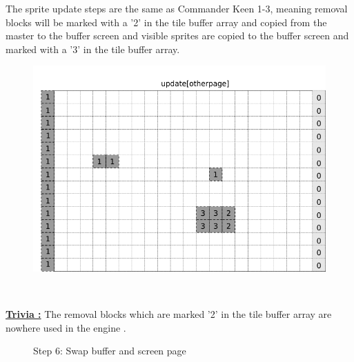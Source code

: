 \documentclass[book.tex]{subfiles}
\begin{document}
\begin{minipage}{.4\textwidth}
The sprite update steps are the same as Commander Keen 1-3, meaning removal blocks will be marked with a '2' in the tile buffer array and copied from the master to the buffer screen and visible sprites are copied to the buffer screen and marked with a '3' in the tile buffer array.
 \end{minipage}
\begin{minipage}{.6\textwidth}
\begin{figure}[H]
  \centering
 \includegraphics[width=.9\textwidth]{screenshots_300dpi/game/Scroll_KC4_6_1-scroll_update_sprite.png}
 \label{fig:kc4_6_update_array}  
\end{figure}
\end{minipage}\\
\par
\textbf{\underline{Trivia :}} The removal blocks which are marked '2' in the tile buffer array are nowhere used in the engine .\\
  \par
\pagebreak

\begin{figure}[H]
\centering
 \caption{Step 6: Swap buffer and screen page}
 \label{fig:k4_6_update_final}
\end{figure}
\end{document}
